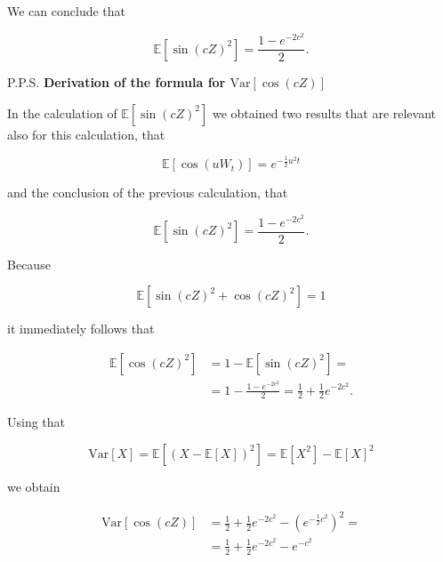 \documentclass{letter}
\begin{document}
We can conclude that

$$\mathbb{E}\left[\sin(cZ)^2\right]=\frac{1-e^{-2c^2}}{2}.$$


{P.P.S. \bf Derivation of the formula for \boldmath$\text{Var}\left[\cos(cZ)\right]$}

In the calculation of $\mathbb{E}[\sin(cZ)^2]$ we obtained two results that are relevant also for this calculation, that

$$\mathbb{E}[\cos(uW_t)]=e^{-\frac{1}{2}u^2t}$$

and the conclusion of the previous calculation, that

$$\mathbb{E}[\sin(cZ)^2]=\frac{1-e^{-2c^2}}{2}.$$

Because

$$\mathbb{E}\left[\sin(cZ)^2+\cos(cZ)^2\right]=1$$

it immediately follows that

\begin{equation*}
\begin{split}
\mathbb{E}\left[\cos(cZ)^2\right]&=1-\mathbb{E}\left[\sin(cZ)^2\right]=\\
&=1-\frac{1-e^{-2c^2}}{2}=\frac{1}{2}+\frac{1}{2}e^{-2c^2}.
\end{split}
\end{equation*}

Using that

$$\text{Var}\left[X\right]=\mathbb{E}\left[\left(X-\mathbb{E}\left[X\right]\right)^2\right]=\mathbb{E}[X^2]-\mathbb{E}[X]^2$$

we obtain

\begin{equation*}
\begin{split}
\text{Var}\left[\cos\left(cZ\right)\right]&=\frac{1}{2}+\frac{1}{2}e^{-2c^2}-\left(e^{-\frac{1}{2}c^2}\right)^2=\\
&=\frac{1}{2}+\frac{1}{2}e^{-2c^2}-e^{-c^2}
\end{split}
\end{equation*}
\end{document}
